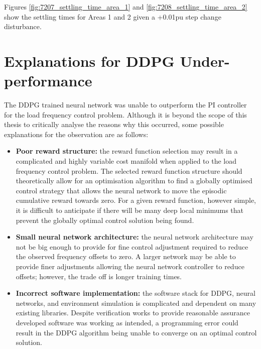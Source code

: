 Figures \ref{fig:7207_settling_time_area_1} and \ref{fig:7208_settling_time_area_2} show the settling times for Areas 1 and 2 given a +0.01pu step change disturbance.

\section{Explanations for DDPG Under-performance}
The DDPG trained neural network was unable to outperform the PI controller for the load frequency control problem. Although it is beyond the scope of this thesis to critically analyse the reasons why this occurred, some possible explanations for the observation are as follows:
\begin{itemize}
	\item \textbf{Poor reward structure:} the reward function selection may result in a complicated and highly variable cost manifold when applied to the load frequency control problem. The selected reward function structure should theoretically allow for an optimisation algorithm to find a globally optimised control strategy that allows the neural network to move the episodic cumulative reward towards zero. For a given reward function, however simple, it is difficult to anticipate if there will be many deep local minimums that prevent the globally optimal control solution being found.
	\item \textbf{Small neural network architecture:} the neural network architecture may not be big enough to provide for fine control adjustment required to reduce the observed frequency offsets to zero. A larger network may be able to provide finer adjustments allowing the neural network controller to reduce offsets; however, the trade off is longer training times.
	\item \textbf{Incorrect software implementation:} the software stack for DDPG, neural networks, and environment simulation is complicated and dependent on many existing libraries. Despite verification works to provide reasonable assurance developed software was working as intended, a programming error could result in the DDPG algorithm being unable to converge on an optimal control solution. 
\end{itemize}
